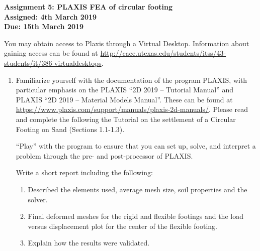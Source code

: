 \documentclass[a4paper,12pt]{article}
\begin{document}
\begin{centering}
	\textbf{
		Assignment 5: PLAXIS FEA of circular footing\\
		Assigned: 4th March 2019\\
		Due: 15th March 2019\\
	}
\end{centering}

\vspace{1em}

You may obtain access to Plaxis through a Virtual Desktop.  Information about gaining access can be found at \url{ http://caee.utexas.edu/students/itss/43-students/it/386-virtualdesktops}.  

 
\begin{enumerate}

	\item 	Familiarize yourself with the documentation of the program PLAXIS, with particular emphasis on the PLAXIS “2D 2019 – Tutorial Manual” and PLAXIS “2D 2019 – Material Models Manual”.  These can be found at \url{https://www.plaxis.com/support/manuals/plaxis-2d-manuals/}.  Please read and complete the following the Tutorial on the settlement of a Circular Footing on Sand (Sections 1.1-1.3).
	
	``Play'' with the program to ensure that you can set up, solve, and interpret a problem through the pre- and post-processor of PLAXIS.  
	
	Write a short report including the following:
	
	\begin{enumerate}
		\item Described the elements used, average mesh size, soil properties and the solver.
		
		\item Final deformed meshes for the rigid and flexible footings and the load versus displacement plot for the center of the flexible footing.

		\item Explain how the results were validated.
	\end{enumerate}
	
\end{enumerate}
\end{document}
